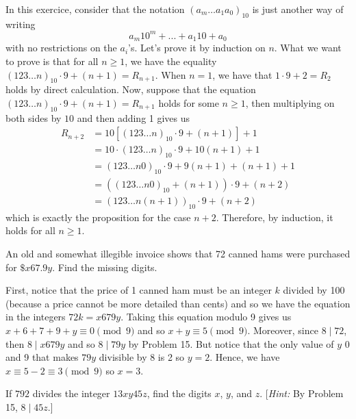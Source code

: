 \begin{solution}
    In this exercice, consider that the notation $(a_m\dots a_1a_0)_{10}$ is just another way of writing 
    $$a_m10^m + ... + a_1 10 + a_0$$
    with no restrictions on the $a_i$'s. Let's prove it by induction on $n$. What we want to prove is that for all $n \geq 1$, we have the equality $(123\dots n)_{10}\cdot 9 + (n+1) = R_{n+1}$. When $n = 1$, we have that $1 \cdot 9 + 2 = R_2$ holds by direct calculation. Now, suppose that the equation $(123\dots n)_{10}\cdot 9 + (n+1) = R_{n+1}$ holds for some $n \geq 1$, then multiplying on both sides by $10$ and then adding 1 gives us 
    \begin{align*}
        R_{n+2} &= 10[(123\dots n)_{10}\cdot 9 + (n+1)] + 1 \\
        &= 10 \cdot (123\dots n)_{10}\cdot 9 + 10(n+1) + 1 \\
        &= (123\dots n 0)_{10}\cdot 9 + 9(n+1) + (n+1) + 1 \\
        &= ((123\dots n 0)_{10} + (n+1))\cdot 9 + (n+2) \\
        &= (123\dots n (n+1))_{10}\cdot 9 + (n+2)
    \end{align*}
    which is exactly the proposition for the case $n + 2$. Therefore, by induction, it holds for all $n \geq 1$. \\
\end{solution}

\begin{exercise}
    An old and somewhat illegible invoice shows that 72 canned hams were purchased for $\$ x67.9y$. Find the missing digits. \\
\end{exercise}

\begin{solution}
    First, notice that the price of 1 canned ham must be an integer $k$ divided by 100 (because a price cannot be more detailed than cents) and so we have the equation in the integers $72k = x679y$. Taking this equation modulo 9 gives us $x + 6 + 7 + 9 + y \equiv 0 \pmod 9$ and so $x + y \equiv 5 \pmod 9$. Moreover, since $8 \mid 72$, then $8 \mid x679y$ and so $8 \mid 79y$ by Problem 15. But notice that the only value of $y$ 0 and 9 that makes $79y$ divisible by 8 is 2 so $y = 2$. Hence, we have $x \equiv 5 - 2 \equiv 3 \pmod{9}$ so $x = 3$. \\ 
\end{solution}

\begin{exercise}
    If $792$ divides the integer $13xy45z$, find the digits $x$, $y$, and $z$. [\textit{Hint:} By Problem 15, $8 \mid 45z$.] \\
\end{exercise}

